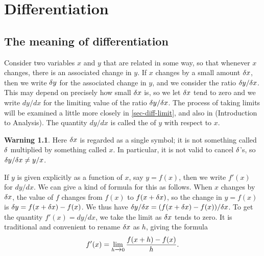 \documentclass[a4paper]{book}
\theoremstyle{definition}
\newtheorem{warning}[theorem]{Warning}
\begin{document}
\chapter{Differentiation}
\label{chap-diff}

\section{The meaning of differentiation}
\label{sec-diff-meaning}

Consider two variables $x$ and $y$ that are related in some way, so
that whenever $x$ changes, there is an associated change in $y$.  If
$x$ changes by a small amount $\delta x$, then we write $\delta y$ for the
associated change in $y$, and we consider the ratio $\delta y/\delta x$.
This may depend on precisely how small $\delta x$ is, so we let $\delta x$
tend to zero and we write $dy/dx$ for the limiting value of the ratio
$\delta y/\delta x$.  The process of taking limits will be examined a little
more closely in \autoref{sec-diff-limit}, and also in 
(Introduction to Analysis).  The quantity $dy/dx$ is called the
 of $y$ with respect to $x$.  

\begin{warning}
 Here $\delta x$ is regarded as a single symbol; it is not something
 called $\delta$ multiplied by something called $x$.  In particular, it
 is not valid to cancel $\delta$'s, so $\delta y/\delta x\neq y/x$.  \bigskip
\end{warning}

If $y$ is given explicitly as a function of $x$, say $y=f(x)$, then we
write $f'(x)$ for $dy/dx$.  We can give a kind of formula for this as
follows.  When $x$ changes by $\delta x$, the value of $f$ changes from
$f(x)$ to $f(x+\delta x)$, so the change in $y=f(x)$ is 
$\delta y=f(x+\delta x)-f(x)$.  We thus have 
$\delta y/\delta x=(f(x+\delta x)-f(x))/\delta x$.  To get the quantity
$f'(x)=dy/dx$, we take the limit as $\delta x$ tends to zero.  It is
traditional and convenient to rename $\delta x$ as $h$, giving the
formula 
\[ f'(x) = \lim_{h\xrightarrow{}0} \frac{f(x+h) - f(x)}{h}. \]
\end{document}
